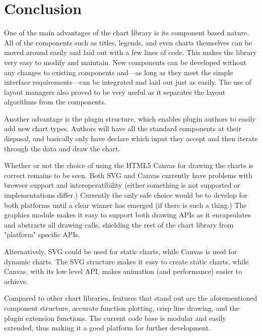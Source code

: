 \chapter{Conclusion}


One of the main advantages of the chart library is its component based nature. All of the components such as titles, legends, and even charts themselves can be moved around easily and laid out with a few lines of code. This makes the library very easy to modify and maintain. New components can be developed without any changes to existing components and---as long as they meet the simple interface requirements---can be integrated and laid out just as easily. The use of layout managers also proved to be very useful as it separates the layout algorithms from the components.

Another advantage is the plugin structure, which enables plugin authors to easily add new chart types. Authors will have all the standard components at their disposal, and basically only have declare which input they accept and then iterate through the data and draw the chart.

Whether or not the choice of using the HTML5 Canvas for drawing the charts is correct remains to be seen. Both SVG and Canvas currently have problems with browser support and interoperatibility (either something is not supported or implementations differ.) Currently the only safe choice would be to develop for both platforms until a clear winner has emerged (if there is such a thing.) The graphics module makes it easy to support both drawing APIs as it encapsulates and abstracts all drawing calls, shielding the rest of the chart library from "platform" specific APIs.

Alternatively, SVG could be used for static charts, while Canvas is used for dynamic charts. The SVG structure makes it easy to create static charts, while Canvas, with its low level API, makes animation (and performance) easier to achieve.

Compared to other chart libraries, features that stand out are the aforementioned component structure, accurate function plotting, crisp line drawing, and the plugin extension functions. The current code base is modular and easily extended, thus making it a good platform for further development.

